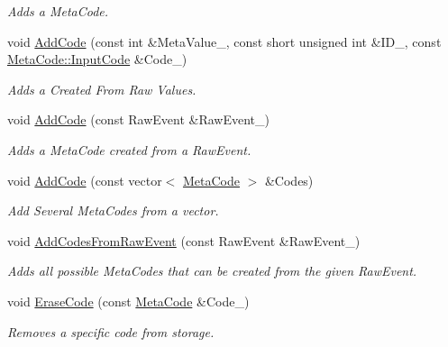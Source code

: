 \begin{DoxyCompactItemize}
\begin{DoxyCompactList}\small\item\em Adds a MetaCode. \item\end{DoxyCompactList}\item 
void \hyperlink{classPhysEventUserInput_ace3b98a502b8e784b58bc5dc599fc0c4}{AddCode} (const int \&MetaValue\_\-, const short unsigned int \&ID\_\-, const \hyperlink{classphys_1_1MetaCode_a3e501cbb5bf0f6f1fdb7211465bda8d8}{MetaCode::InputCode} \&Code\_\-)
\begin{DoxyCompactList}\small\item\em Adds a Created From Raw Values. \item\end{DoxyCompactList}\item 
void \hyperlink{classPhysEventUserInput_a385a4f7a6e88be43b6ba1ffc2a1bb5e3}{AddCode} (const RawEvent \&RawEvent\_\-)
\begin{DoxyCompactList}\small\item\em Adds a MetaCode created from a RawEvent. \item\end{DoxyCompactList}\item 
void \hyperlink{classPhysEventUserInput_aecac02073d3296c71e0ae4534daf8dce}{AddCode} (const vector$<$ \hyperlink{classphys_1_1MetaCode}{MetaCode} $>$ \&Codes)
\begin{DoxyCompactList}\small\item\em Add Several MetaCodes from a vector. \item\end{DoxyCompactList}\item 
void \hyperlink{classPhysEventUserInput_a9e42f42f9a4a42f792e5cf95856669c0}{AddCodesFromRawEvent} (const RawEvent \&RawEvent\_\-)
\begin{DoxyCompactList}\small\item\em Adds all possible MetaCodes that can be created from the given RawEvent. \item\end{DoxyCompactList}\item 
void \hyperlink{classPhysEventUserInput_a1dbd2996770df334fba9f67d9bb4ffa0}{EraseCode} (const \hyperlink{classphys_1_1MetaCode}{MetaCode} \&Code\_\-)
\begin{DoxyCompactList}\small\item\em Removes a specific code from storage. \item\end{DoxyCompactList}\item 

\end{DoxyCompactItemize}
